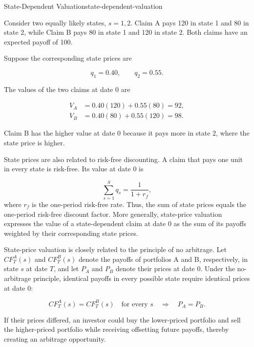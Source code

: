 \begin{example}{State-Dependent Valuation}{state-dependent-valuation}

Consider two equally likely states, $s=1,2$. Claim A pays 120 in state 1 and 80 in state 2, while Claim B pays 80 in state 1 and 120 in state 2. Both claims have an expected payoff of 100.

Suppose the corresponding state prices are

$$
q_{1}=0.40,
\qquad
q_{2}=0.55.
$$

The values of the two claims at date 0 are

\begin{align}
V_A
&=
0.40(120)+0.55(80)=92,\\
V_B
&=0.40(80)+0.55(120)=98.
\end{align}

Claim B has the higher value at date 0 because it pays more in state 2, where the state price is higher.

\end{example}

State prices are also related to risk-free discounting. A claim that pays one unit in every state is risk-free. Its  value at date 0 is

\begin{equation}
\sum_{s=1}^{S}q_s=\frac{1}{1+r_f},
\label{eq:ch5-state-price-riskfree}
\end{equation}
where $r_f$ is the one-period risk-free rate. Thus, the sum of state prices equals the one-period risk-free discount factor. More generally, state-price valuation expresses the value of a state-dependent claim at date 0 as the sum of its payoffs weighted by their corresponding state prices.

State-price valuation is closely related to the principle of no arbitrage. Let $CF_T^A(s)$ and $CF_T^B(s)$ denote the payoffs of portfolios A and B, respectively, in state $s$ at date $T$, and let $P_A$ and $P_B$ denote their prices at date 0. Under the no-arbitrage principle, identical payoffs in every possible state require identical prices at date 0:

\begin{equation}
CF_T^A(s)=CF_T^B(s)
\quad \text{for every } s
\quad \Longrightarrow \quad
P_A=P_B.
\label{eq:ch5-law-one-price}
\end{equation}

If their prices differed, an investor could buy the lower-priced portfolio and sell the higher-priced portfolio while receiving offsetting future payoffs, thereby creating an arbitrage opportunity.

